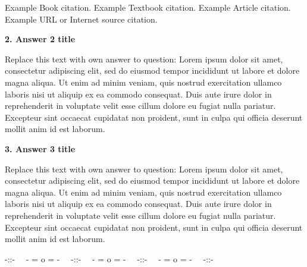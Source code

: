 \documentclass[a4paper, 11pt]{article}
\begin{document}
Example Book \autocite{Shreve2} citation. Example Textbook \autocite{WQUDFT5} citation.
Example Article \autocite{Tapa2016} citation.
Example URL or Internet source \autocite{Investopedia} citation.


\vspace{1cm} %
\textbf{2. Answer 2 title}  %

Replace this text with own answer to question: Lorem ipsum dolor sit amet, consectetur adipiscing elit, sed do eiusmod tempor incididunt ut labore et dolore magna aliqua. Ut enim ad minim veniam, quis nostrud exercitation ullamco laboris nisi ut aliquip ex ea commodo consequat. Duis aute irure dolor in reprehenderit in voluptate velit esse cillum dolore eu fugiat nulla pariatur. Excepteur sint occaecat cupidatat non proident, sunt in culpa qui officia deserunt mollit anim id est laborum.


\vspace{1cm}  %
\textbf{3. Answer 3 title}  %

Replace this text with own answer to question: Lorem ipsum dolor sit amet, consectetur adipiscing elit, sed do eiusmod tempor incididunt ut labore et dolore magna aliqua. Ut enim ad minim veniam, quis nostrud exercitation ullamco laboris nisi ut aliquip ex ea commodo consequat. Duis aute irure dolor in reprehenderit in voluptate velit esse cillum dolore eu fugiat nulla pariatur. Excepteur sint occaecat cupidatat non proident, sunt in culpa qui officia deserunt mollit anim id est laborum.


\medskip
\begin{center} -::- \ \ - = o = - \ \ -::- \ \ - = o = - \ \ -::- \ \ - = o = - \ \ -::- \end{center}

\medskip
\printbibliography

\end{document}
